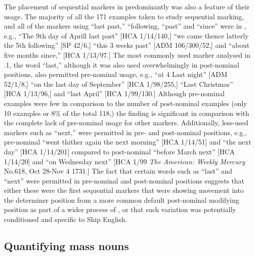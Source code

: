 The placement of sequential markers in predominantly  was also a feature of their usage. The majority of all the 171 examples taken to study sequential marking, and all of the markers using “last past,” “following, “past” and “since” were in , e.g., “The 9th day of Aprill last past” [HCA 1/14/140,] “we came thence latterly the 5th following” [SP 42/6,] “this 3 weeks past” [ADM 106/300/52,] and “about five months since,” [HCA 1/13/97.] The most commonly used marker analysed in .1, the word “last,” although it was also used overwhelmingly in post-nominal positions, also permitted pre-nominal usage, e.g., “at 4 Last night” [ADM 52/1/8,] “on the last day of September” [HCA 1/98/255,] “Last Christmas” [HCA 1/13/96,] and “last April” [HCA 1/99/130.] Although pre-nominal examples were few in comparison to the number of post-nominal examples (only 10 examples or 8\% of the total 118,) the finding is significant in comparison with the complete lack of pre-nominal usage for other markers. Additionally, less-used markers such as “next,” were permitted in pre- and post-nominal positions, e.g., pre-nominal “went thither again the next morning” [HCA 1/14/51] and “the next day” [HCA 1/14/201] compared to post-nominal “before March next” [HCA 1/14/20] and “on Wednesday next” [HCA 1/99 \textit{The American: Weekly Mercury} No.618, Oct 28-Nov 4 1731.] The fact that certain words such as “last” and “next” were permitted in pre-nominal and post-nominal positions suggests that either these were the first sequential markers that were showing movement into the determiner position from a more common default post-nominal modifying position as part of a wider process of , or that such variation was potentially conditioned and specific to Ship English. 

\subsection{{Quantifying mass nouns}}%

